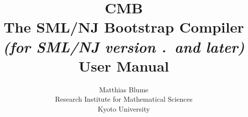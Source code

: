 \documentclass[titlepage,letterpaper]{article}
\author{Matthias Blume \\
Research Institute for Mathematical Sciences \\
Kyoto University}
\title{{\bf CMB}\\
The SML/NJ Bootstrap Compiler \\
{\it\small (for SML/NJ version \smlmj.\smlmn~and later)} \\
User Manual}
\begin{document}


\maketitle

\pagebreak

\tableofcontents

\pagebreak




\pagebreak


%

\pagebreak


\end{document}
